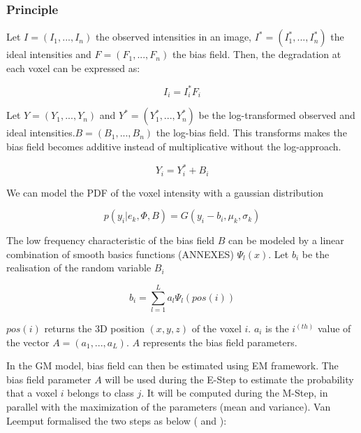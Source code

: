 \subsubsection{Principle}
Let $I=(I_1, ..., I_n)$ the observed intensities in an image, $I^*=(I_1^*, ..., I_n^*)$ the ideal intensities and $F=(F_1, ..., F_n)$ the bias field. Then, the degradation at each voxel can be expressed as:

  \begin{equation*}
  I_i=I_i^*F_i
  \end{equation*}

Let $Y=(Y_1, ..., Y_n)$ and $Y^*=(Y_1^*, ..., Y_n^*)$ be the log-transformed observed and ideal intensities.$B=(B_1, ..., B_n)$ the log-bias field. This transforms makes the bias field becomes additive instead of multiplicative without the log-approach.

  \begin{equation*}
  Y_i=Y_i^* + B_i
  \end{equation*}
  
We can model the PDF of the voxel intensity with a gaussian distribution

 \begin{equation*}
  p(y_i|e_k, \Phi, B) = G(y_i-b_i,\mu_k,\sigma_k)
  \end{equation*}
  
The low frequency characteristic of the bias field $B$ can be modeled by a linear combination of smooth basics functions (ANNEXES) $\Psi_l(x)$. Let $b_i$ be the realisation of the random variable $B_i$ 

  \begin{equation*}
  b_i = \sum_{l=1}^L a_l\Psi_l(pos(i))
  \end{equation*}
  
 $pos(i)$ returns the 3D position $(x,y,z)$ of the voxel $i$. $a_i$ is the $i^{(th)}$ value of the vector $A=(a_1, ..., a_L)$. $A$ represents the bias field parameters.
 \par
In the GM model, bias field can then be estimated using EM framework. The bias field parameter $A$ will be used during the E-Step to estimate the probability that a voxel $i$ belongs to class $j$. It will be computed during the M-Step, in parallel with the maximization of the parameters (mean and variance).
Van Leemput formalised the two steps as below (\cite{8} and \cite{9}):\\

